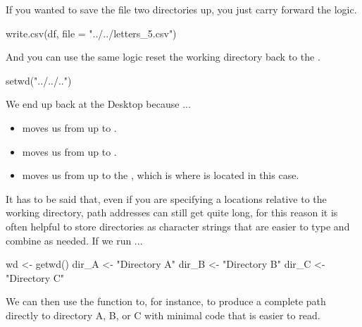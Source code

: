 \vspace{2em}


\noindent
If you wanted to save the file two directories up, you just carry forward the logic.

\begin{inR}
write.csv(df, file = "../../letters_5.csv")
\end{inR}

\vspace{2em}


\noindent
And you can use the same logic reset the working directory back to the .

\begin{inR}
setwd("../../..")
\end{inR}

\medskip

\noindent We end up back at the Desktop because ...

\begin{itemize}
    \item {} moves us from  up to .
    \item {} moves us from  up to .
    \item {} moves us from  up to the , which is where  is located in this case.
\end{itemize}

It has to be said that, even if you are specifying a locations relative to the working directory, path addresses can still get quite long, for this reason it is often helpful to store directories as character strings that are easier to type and combine as needed. If we run ...

\begin{inR}
wd <- getwd()
dir_A <- "Directory A"
dir_B <- "Directory B"
dir_C <- "Directory C"
\end{inR}

\medskip

\noindent
We can then use the  function to, for instance, to produce a complete path directly to directory A, B, or C with minimal code that is easier to read.

